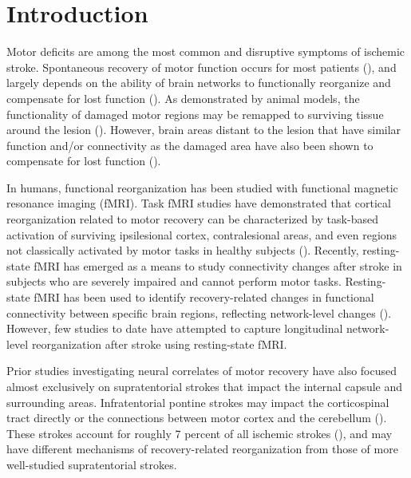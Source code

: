 \documentclass[phd,tocprelim]{cornell}
\begin{document}
%
\section{Introduction}
Motor deficits are among the most common and disruptive symptoms of ischemic stroke. Spontaneous recovery of motor function occurs for most patients (\cite{Duncan2000-uj}), and largely depends on the ability of brain networks to functionally reorganize and compensate for lost function (\cite{Grefkes2008-bt, Rehme2013-ap}). As demonstrated by animal models, the functionality of damaged motor regions may be remapped to surviving tissue around the lesion (\cite{Winship2009-af}). However, brain areas distant to the lesion that have similar function and/or connectivity as the damaged area have also been shown to compensate for lost function (\cite{Winship2009-af, Adam2020-jk, Murata2015-ss, Brown2009-jn}).
	
	In humans, functional reorganization has been studied with functional magnetic resonance imaging (fMRI). Task fMRI studies have demonstrated that cortical reorganization related to motor recovery can be characterized by task-based activation of surviving ipsilesional cortex, contralesional areas, and even regions not classically activated by motor tasks in healthy subjects (\cite{Ward2003-zd}). Recently, resting-state fMRI has emerged as a means to study connectivity changes after stroke in subjects who are severely impaired and cannot perform motor tasks. Resting-state fMRI has been used to identify recovery-related changes in functional connectivity between specific brain regions, reflecting network-level changes (\cite{Park2011-kx}). However, few studies to date have attempted to capture longitudinal network-level reorganization after stroke using resting-state fMRI. 
	
	Prior studies investigating neural correlates of motor recovery have also focused almost exclusively on supratentorial strokes that impact the internal capsule and surrounding areas.  Infratentorial pontine strokes may impact the corticospinal tract directly or the connections between motor cortex and the cerebellum (\cite{Lu2011-ow}). These strokes  account for roughly 7 percent of all ischemic strokes (\cite{Saia2009-ik}), and may have different mechanisms of recovery-related reorganization from those of more well-studied supratentorial strokes.
	
\end{document}
